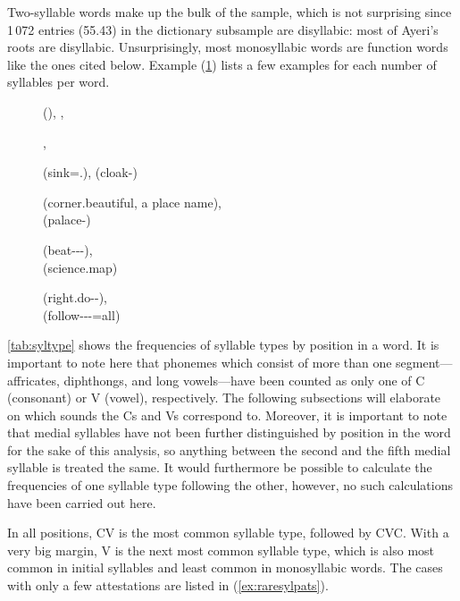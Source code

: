 Two-syllable words make up the bulk of the sample, which is not surprising
since 1\,072 entries (55.43\pct) in the dictionary subsample are disyllabic:
most of Ayeri's roots are disyllabic. Unsurprisingly, most monosyllabic words
are function words like the ones cited below. Example
(\ref{ex:syllperwordtypes}) lists a few examples for each number of syllables
per word.

\begin{figure}
\pex\label{ex:syllperwordtypes}
	\a {} (\AgtT{}),
		,
		
	\a {},
		
	\a {} 
		(sink=\TsgM{}.\Aarg{}), 
		 (cloak-\PargI{})
		
	\a {} (corner.beautiful, a place 
		name),\\
		 (palace-\Gen{})
		
	\a {} 
		(beat-\Ptcp{}-\Nmlz{}-\Parg{}),\\
		(science.map)
		
	\a {} 
		(right.do-\Nmlz{}-\Gen{}),\\
		 (follow-\Agtz-\Pl{}-\Aarg{}=all)
\xe
\end{figure}

\autoref{tab:syltype} shows the frequencies of syllable types by position in a
word. It is important to note here that phonemes which consist of more than one
segment---affricates, diphthongs, and long vowels---have been counted as only
one of C (consonant) or V (vowel), respectively. The following subsections will
elaborate on which sounds the Cs and Vs correspond to. Moreover, it is important
to note that medial syllables have not been further distinguished by position in
the word for the sake of this analysis, so anything between the second and the
fifth medial syllable is treated the same. It would furthermore be possible to
calculate the frequencies of one syllable type following the other, however, no
such calculations have been carried out here.

In all positions, CV is the most common syllable type, followed by CVC. With a
very big margin, V is the next most common syllable type, which is also most
common in initial syllables and least common in monosyllabic words. The cases
with only a few attestations are listed in (\ref{ex:raresylpats}).

